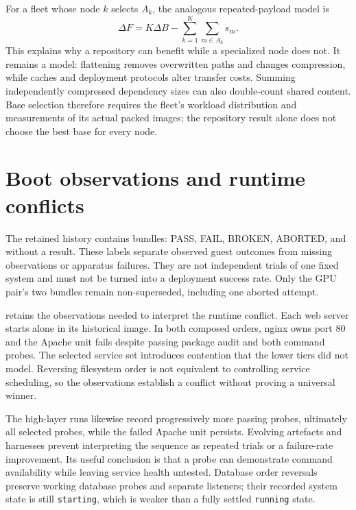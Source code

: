 For a fleet whose node $k$ selects $A_k$, the analogous repeated-payload model is
\begin{equation}
\Delta F=K\Delta B-\sum_{k=1}^{K}\sum_{m\in A_k}s_m.
\end{equation}
This explains why a repository can benefit while a specialized node does not. It remains a model: flattening removes overwritten paths and changes compression, while caches and deployment protocols alter transfer costs. Summing independently compressed dependency sizes can also double-count shared content. Base selection therefore requires the fleet's workload distribution and measurements of its actual packed images; the repository result alone does not choose the best base for every node.

\section{Boot observations and runtime conflicts}

The retained history contains  bundles:  PASS,  FAIL,  BROKEN,  ABORTED, and  without a result. These labels separate observed guest outcomes from missing observations or apparatus failures. They are not independent trials of one fixed system and must not be turned into a deployment success rate. Only the GPU pair's two bundles remain non-superseded, including one aborted attempt.

 retains the observations needed to interpret the runtime conflict. Each web server starts alone in its historical image. In both composed orders, nginx owns port \num{80} and the Apache unit fails despite passing package audit and both command probes. The selected service set introduces contention that the lower tiers did not model. Reversing filesystem order is not equivalent to controlling service scheduling, so the observations establish a conflict without proving a universal winner.



The high-layer runs likewise record progressively more passing probes, ultimately all selected probes, while the failed Apache unit persists. Evolving artefacts and harnesses prevent interpreting the sequence as repeated trials or a failure-rate improvement. Its useful conclusion is that a probe can demonstrate command availability while leaving service health untested. Database order reversals preserve working database probes and separate listeners; their recorded system state is still \texttt{starting}, which is weaker than a fully settled \texttt{running} state.

